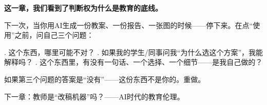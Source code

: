 \vspace{1cm}

\begin{decision-point}
\label{decision:chap10}

\noindent\textbf{这一章，我们看到了判断权为什么是教育的底线。}

\vspace{0.3cm}

\noindent 下一次，当你用AI生成一份教案、一份报告、一张图的时候——停下来。在点``使用''之前，问自己三个问题：

. 这个东西，哪里可能不对？
. 如果我的学生/同事问我``为什么选这个方案''，我能解释吗？
. 这个东西里，有没有一句话、一个选择、一个细节——是我自己做的？

\noindent 如果第三个问题的答案是``没有''——这份东西不是你的。重做。
\end{decision-point}

\vspace{0.5cm}

\begin{flushright}
{\small\color{muted} 下一章：教师是``改稿机器''吗？——AI时代的教育伦理。}
\end{flushright}
